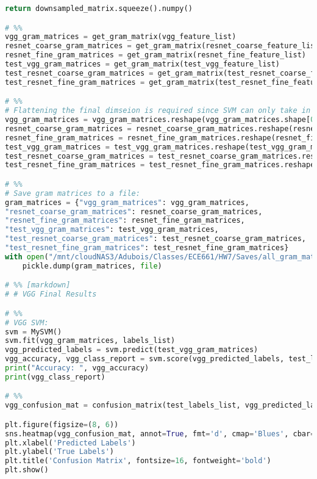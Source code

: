 \documentclass{article}
\begin{document}
\begin{lstlisting}[language=Python]
    return downsampled_matrix.squeeze().numpy()

# %%
vgg_gram_matrices = get_gram_matrix(vgg_feature_list)
resnet_coarse_gram_matrices = get_gram_matrix(resnet_coarse_feature_list)
resnet_fine_gram_matrices = get_gram_matrix(resnet_fine_feature_list)
test_vgg_gram_matrices = get_gram_matrix(test_vgg_feature_list)
test_resnet_coarse_gram_matrices = get_gram_matrix(test_resnet_coarse_feature_list)
test_resnet_fine_gram_matrices = get_gram_matrix(test_resnet_fine_feature_list)

# %%
# Flattening the final dimseion is required since SVM can only take in as inputs 2 dims (Batch, features)
vgg_gram_matrices = vgg_gram_matrices.reshape(vgg_gram_matrices.shape[0], -1)
resnet_coarse_gram_matrices = resnet_coarse_gram_matrices.reshape(resnet_coarse_gram_matrices.shape[0], -1)
resnet_fine_gram_matrices = resnet_fine_gram_matrices.reshape(resnet_fine_gram_matrices.shape[0], -1)
test_vgg_gram_matrices = test_vgg_gram_matrices.reshape(test_vgg_gram_matrices.shape[0], -1)
test_resnet_coarse_gram_matrices = test_resnet_coarse_gram_matrices.reshape(test_resnet_coarse_gram_matrices.shape[0], -1)
test_resnet_fine_gram_matrices = test_resnet_fine_gram_matrices.reshape(test_resnet_fine_gram_matrices.shape[0], -1)

# %%
# Save gram matrices to a file:
gram_matrices = {"vgg_gram_matrices": vgg_gram_matrices,
"resnet_coarse_gram_matrices": resnet_coarse_gram_matrices,
"resnet_fine_gram_matrices": resnet_fine_gram_matrices,
"test_vgg_gram_matrices": test_vgg_gram_matrices,
"test_resnet_coarse_gram_matrices": test_resnet_coarse_gram_matrices,
"test_resnet_fine_gram_matrices": test_resnet_fine_gram_matrices}
with open("/mnt/cloudNAS3/Adubois/Classes/ECE661/HW7/Saves/all_gram_matrices.pkl", "wb") as file:
    pickle.dump(gram_matrices, file)

# %% [markdown]
# # VGG Final Results

# %%
# VGG SVM:
svm = MySVM()
svm.fit(vgg_gram_matrices, labels_list)
vgg_predicted_labels = svm.predict(test_vgg_gram_matrices)
vgg_accuracy, vgg_class_report = svm.score(vgg_predicted_labels, test_labels_list)
print("Accuracy: ", vgg_accuracy)
print(vgg_class_report)

# %%
vgg_confusion_mat = confusion_matrix(test_labels_list, vgg_predicted_labels)

plt.figure(figsize=(8, 6))
sns.heatmap(vgg_confusion_mat, annot=True, fmt='d', cmap='Blues', cbar=False)
plt.xlabel('Predicted Labels')
plt.ylabel('True Labels')
plt.title('Confusion Matrix', fontsize=16, fontweight='bold')
plt.show()


\end{lstlisting}
\end{document}
